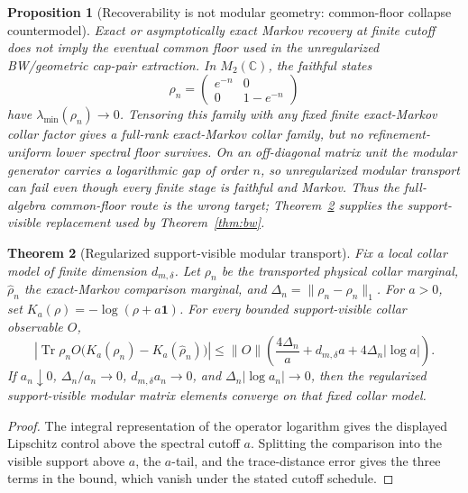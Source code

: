 \documentclass[11pt]{article}
\newtheorem{theorem}{Theorem}[section]
\newtheorem{proposition}[theorem]{Proposition}
\begin{document}
\begin{proposition}[Recoverability is not modular geometry: common-floor collapse countermodel]\label{prop:commonfloor-collapse}
Exact or asymptotically exact Markov recovery at finite cutoff does not imply the eventual common floor used in the unregularized BW/geometric cap-pair extraction. In \(M_2(\mathbb C)\), the faithful states
\[
\rho_n=\begin{pmatrix}e^{-n}&0\\0&1-e^{-n}\end{pmatrix}
\]
have \(\lambda_{\min}(\rho_n)\to0\). Tensoring this family with any fixed finite exact-Markov collar factor gives a full-rank exact-Markov collar family, but no refinement-uniform lower spectral floor survives. On an off-diagonal matrix unit the modular generator carries a logarithmic gap of order \(n\), so unregularized modular transport can fail even though every finite stage is faithful and Markov. Thus the full-algebra common-floor route is the wrong target; Theorem~\ref{thm:regularized-modular-transport} supplies the support-visible replacement used by Theorem~\ref{thm:bw}.
\end{proposition}

\begin{theorem}[Regularized support-visible modular transport]\label{thm:regularized-modular-transport}
Fix a local collar model of finite dimension \(d_{m,\delta}\). Let \(\rho_n\) be the transported physical collar marginal, \(\widehat\rho_n\) the exact-Markov comparison marginal, and \(\Delta_n=\|\rho_n-\widehat\rho_n\|_1\). For \(a>0\), set \(K_a(\rho)=-\log(\rho+a\mathbf 1)\). For every bounded support-visible collar observable \(O\),
\[
\left|\operatorname{Tr}\rho_n O\bigl(K_a(\rho_n)-K_a(\widehat\rho_n)\bigr)\right|
\le
\|O\|\left(\frac{4\Delta_n}{a}+d_{m,\delta}a+4\Delta_n|\log a|\right).
\]
If \(a_n\downarrow0\), \(\Delta_n/a_n\to0\), \(d_{m,\delta}a_n\to0\), and \(\Delta_n|\log a_n|\to0\), then the regularized support-visible modular matrix elements converge on that fixed collar model.
\end{theorem}

\begin{proof}
The integral representation of the operator logarithm gives the displayed Lipschitz control above the spectral cutoff \(a\). Splitting the comparison into the visible support above \(a\), the \(a\)-tail, and the trace-distance error gives the three terms in the bound, which vanish under the stated cutoff schedule.
\end{proof}
\end{document}
